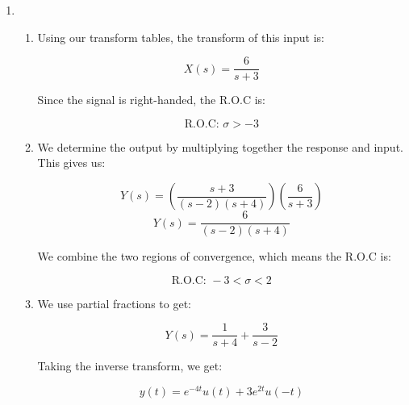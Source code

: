 \begin{enumerate}[label=\Alph*.]
  \item

    \begin{enumerate}[label=\Roman*.]

      \item Using our transform tables, the transform of this input is:

        $$\boxed{X(s)=\frac{6}{s+3}}$$

        Since the signal is right-handed, the R.O.C is:

        $$\boxed{\text{R.O.C: } \sigma>-3}$$

      \item We determine the output by multiplying together the response and input. This gives us:

        $$Y(s)=\left( \frac{s+3}{(s-2)(s+4)} \right)\left( \frac{6}{s+3} \right)$$
        $$\boxed{Y(s)=\frac{6}{(s-2)(s+4)}}$$

        We combine the two regions of convergence, which means the R.O.C is:

        $$\boxed{\text{R.O.C: }-3<\sigma<2}$$

      \item We use partial fractions to get:

        $$Y(s)=\frac{1}{s+4}+\frac{3}{s-2}$$

        Taking the inverse transform, we get:

        $$\boxed{y(t)=e^{-4t}u(t)+3e^{2t}u(-t)}$$

    \end{enumerate}

\end{enumerate}



